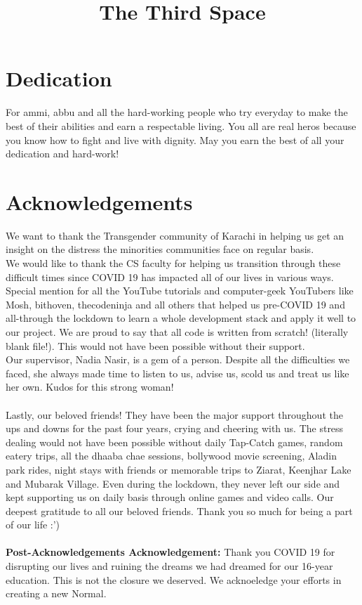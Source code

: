 \documentclass[12pt,twosided]{report}
\title{The Third Space}
\begin{document}

\chapter*{Dedication}
For ammi, abbu and all the hard-working people who try everyday to make the best of their abilities and earn a respectable living. You all are real heros because you know how to fight and live with dignity. May you earn the best of all your dedication and hard-work!

\chapter*{Acknowledgements}
We want to thank the Transgender community of Karachi in helping us get an insight on the distress the minorities communities face on regular basis.\\ We would like to thank the CS faculty for helping us transition through these difficult times since COVID 19 has impacted all of our lives in various ways.\\ Special mention for all the YouTube tutorials and computer-geek YouTubers like Mosh, bithoven, thecodeninja and all others that helped us pre-COVID 19 and all-through the lockdown to learn a whole development stack and apply it well to our project. We are proud to say that all code is written from scratch! (literally blank file!). This would not have been possible without their support.\\ Our supervisor, Nadia Nasir, is a gem of a person. Despite all the difficulties we faced, she always made time to listen to us, advise us, scold us and treat us like her own. Kudos for this strong woman!\\\\ Lastly, our beloved friends! They have been the major support throughout the ups and downs for the past four years, crying and cheering with us. The stress dealing would not have been possible without daily Tap-Catch games, random eatery trips, all the dhaaba chae sessions, bollywood movie screening, Aladin park rides, night stays with friends or memorable trips to Ziarat, Keenjhar Lake and Mubarak Village. Even during the lockdown, they never left our side and kept supporting us on daily basis through online games and video calls. Our deepest gratitude to all our beloved friends. Thank you so much for being a part of our life :')\\\\\textbf{Post-Acknowledgements Acknowledgement:} Thank you COVID 19 for disrupting our lives and ruining the dreams we had dreamed for our 16-year education. This is not the closure we deserved. We acknoeledge your efforts in creating a new Normal.
\end{document}
